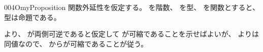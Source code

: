 \documentclass[index]{subfiles}
\begin{document}
\begin{myBlock}{004O}{myProposition}
  関数外延性を仮定する。
  を階数、
  を型、
  を関数とすると、
  型は命題である。
\end{myBlock}
\begin{myProof}
  より、
  が両側可逆であると仮定して
  が可縮であることを示せばよいが、
  よりは同値なので、
  からが可縮であることが従う。
\end{myProof}
\end{document}
